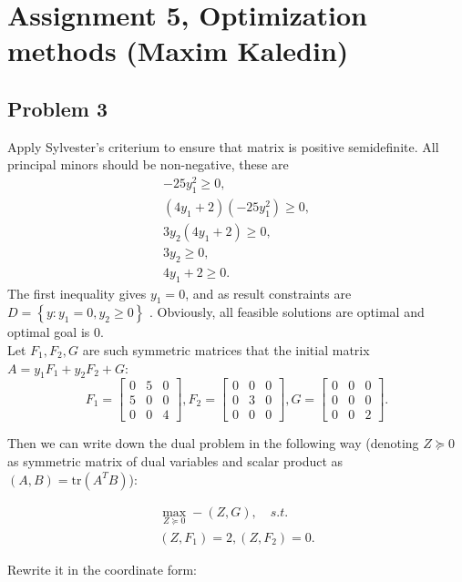 \documentclass[a4paper,12pt,russian]{extreport}
\begin{document}
\chapter*{ Assignment 5, Optimization methods (Maxim Kaledin)}

\section*{Problem 3}

Apply Sylvester's criterium to ensure that matrix is positive semidefinite. All principal minors should be non-negative, these are
\begin{align*}
-25y_1^2 \geq 0,\\
(4y_1+2)(-25y_1^2) \geq 0,\\
3y_2(4y_1+2) \geq 0,\\
3y_2 \geq 0,\\
4y_1+2 \geq 0.
\end{align*}
The first inequality gives $y_1=0$, and as result constraints are $D=\left\lbrace y: y_1=0,y_2 \geq 0\right\rbrace$ . Obviously, all feasible solutions are optimal and optimal goal is $0$.\\

Let $F_1,F_2,G$ are such symmetric matrices that the initial matrix $A=y_1F_1+y_2F_2+G$:
$$
F_1 =
\begin{bmatrix}
0 & 5 & 0\\
5 & 0 & 0\\
0 & 0 & 4
\end{bmatrix}, 
F_2 =
\begin{bmatrix}
0 & 0 & 0\\
0 & 3 & 0\\
0 & 0 & 0
\end{bmatrix}, 
G =
\begin{bmatrix}
0 & 0 & 0\\
0 & 0 & 0\\
0 & 0 & 2
\end{bmatrix}.
$$

Then we can write down the dual problem in the following way (denoting $Z\succeq 0$ as symmetric matrix of dual variables and scalar product as $(A,B)=\text{tr}(A^TB)$):

\begin{align*}
\max_{Z \succeq 0} - (Z,G), \quad s.t. \\
(Z,F_1)=2,
(Z,F_2)=0.
\end{align*}

Rewrite it in the coordinate form:
\end{document}
